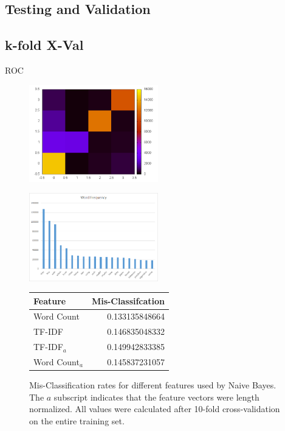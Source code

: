\documentclass[10pt,twocolumn]{article}
\begin{document}
\subsection{Testing and Validation}

\subsection*{k-fold X-Val}

ROC
\begin{figure}
  \centering
  \includegraphics[width=0.5\textwidth]{./confusion.png}
  \label{confusion}
\end{figure}
\begin{figure}
  \centering
  \includegraphics[width=0.5\textwidth]{./word_frequency.png}
  \label{freq}
\end{figure}
\begin{figure}
  \centering
  \begin{tabular}{|l || r|}
  \hline
  Feature & Mis-Classifcation\\
  \hline
  Word Count     & 0.133135848664 \\
  TF-IDF         & 0.146835048332 \\
  TF-IDF$_a$     & 0.149942833385 \\
  Word Count$_a$ & 0.145837231057 \\
  \hline
  \end{tabular}
  \caption {Mis-Classification rates for different features used by Naive Bayes. The $a$ subscript indicates that the feature vectors were length normalized. All values were calculated after 10-fold cross-validation on the entire training set.}
\end{figure}
\end{document}
